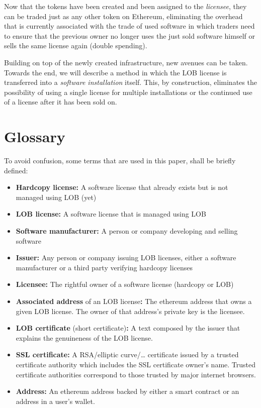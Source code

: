 \documentclass[a4paper]{article}
\begin{document}
Now that the tokens have been created and been assigned to the \emph{licensee}, they can be traded just as any other token on Ethereum, eliminating the overhead that is currently associated with the trade of used software in which traders need to ensure that the previous owner no longer uses the just sold software himself or sells the same license again (double spending).

Building on top of the newly created infrastructure, new avenues can be taken. Towards the end, we will describe a method in which the LOB license is transferred into a \emph{software installation} itself. This, by construction, eliminates the possibility of using a single license for multiple installations or the continued use of a license after it has been sold on.

\section{Glossary}

To avoid confusion, some terms that are used in this paper, shall be briefly defined:

\begin{itemize}
  \item \textbf{Hardcopy license:} A software license that already exists but is not managed using LOB (yet)
  \item \textbf{LOB license:} A software license that is managed using LOB
  \item \textbf{Software manufacturer:} A person or company developing and selling software
  \item \textbf{Issuer:} Any person or company issuing LOB licenses, either a software manufacturer or a third party verifying hardcopy licenses
  \item \textbf{Licensee:} The rightful owner of a software license (hardcopy or LOB)
  \item \textbf{Associated address} of an LOB license\textbf{:} The ethereum address that owns a given LOB license. The owner of that address's private key is the licensee.
  \item \textbf{LOB certificate} (short certificate)\textbf{:} A text composed by the issuer that explains the genuineness of the LOB license.
  \item \textbf{SSL certificate:} A RSA/elliptic curve/… certificate issued by a trusted certificate authority which includes the SSL certificate owner's name. Trusted certificate authorities correspond to those trusted by major internet browsers.
  \item \textbf{Address:} An ethereum address backed by either a smart contract or an address in a user's wallet.
\end{itemize}
\end{document}
